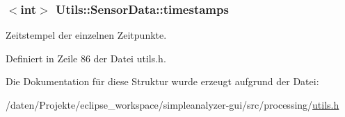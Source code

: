 \hypertarget{structUtils_1_1SensorData_a654f9606c3ddc6e93afb86a116d11ea5}{
\subsubsection[{timestamps}]{$<$int$>$ Utils\-::\-Sensor\-Data\-::timestamps}}\label{structUtils_1_1SensorData_a654f9606c3ddc6e93afb86a116d11ea5}


Zeitstempel der einzelnen Zeitpunkte. 



Definiert in Zeile 86 der Datei utils.\-h.



Die Dokumentation für diese Struktur wurde erzeugt aufgrund der Datei\-:\begin{DoxyCompactItemize}
\item 
/daten/\-Projekte/eclipse\-\_\-workspace/simpleanalyzer-\/gui/src/processing/\hyperlink{utils_8h}{utils.\-h}\end{DoxyCompactItemize}
